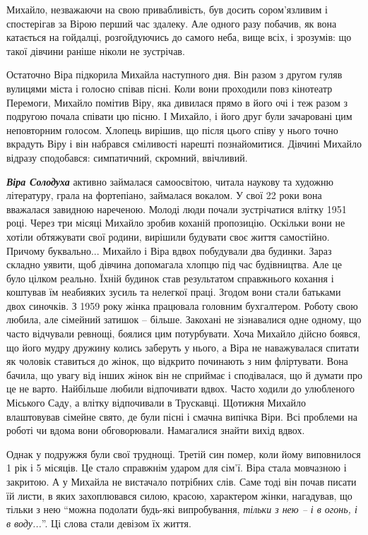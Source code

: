 
Михайло, незважаючи на свою привабливість, був досить сором'язливим і
спостерігав за Вірою перший час здалеку. Але одного разу побачив, як вона
катається на гойдалці, розгойдуючись до самого неба, вище всіх, і зрозумів: що
такої дівчини раніше ніколи не зустрічав.

Остаточно Віра підкорила Михайла наступного дня. Він разом з другом гуляв
вулицями міста і голосно співав пісні. Коли вони проходили повз кінотеатр
Перемоги, Михайло помітив Віру, яка дивилася прямо в його очі і теж разом з
подругою почала співати цю пісню. І Михайло, і його друг були зачаровані цим
неповторним голосом. Хлопець вирішив, що після цього співу у нього точно
вкрадуть Віру і він набрався сміливості нарешті познайомитися. Дівчині Михайло
відразу сподобався: симпатичний, скромний, ввічливий.


\emph{\textbf{Віра Солодуха}} активно займалася самоосвітою, читала наукову та художню
літературу, грала на фортепіано, займалася вокалом. У свої 22 роки вона
вважалася завидною нареченою. Молоді люди почали зустрічатися влітку 1951 році.
Через три місяці Михайло зробив коханій пропозицію. Оскільки вони не хотіли
обтяжувати свої родини, вирішили будувати своє життя самостійно. Причому
буквально... Михайло і Віра вдвох побудували два будинки. Зараз складно уявити,
щоб дівчина допомагала хлопцю під час будівництва. Але це було цілком реально.
Їхній будинок став результатом справжнього кохання і коштував їм неабияких
зусиль та нелегкої праці. Згодом вони стали батьками двох синочків. З 1959 року
жінка працювала головним бухгалтером. Роботу свою любила, але сімейний затишок
– більше. Закохані не зізнавалися одне одному, що часто відчували ревнощі,
боялися цим потурбувати. Хоча Михайло дійсно боявся, що його мудру дружину
колись заберуть у нього, а Віра не наважувалася спитати як чоловік ставиться до
жінок, що відкрито починають з ним фліртувати. Вона бачила, що увагу від інших
жінок він не сприймає і сподівалася, що й думати про це не варто. Найбільше
любили відпочивати вдвох. Часто ходили до улюбленого Міського Саду, а влітку
відпочивали в Трускавці. Щотижня Михайло влаштовував сімейне свято, де були
пісні і смачна випічка Віри. Всі проблеми на роботі чи вдома вони обговорювали.
Намагалися знайти вихід вдвох.

Однак у подружжя були свої труднощі. Третій син помер, коли йому виповнилося 1
рік і 5 місяців. Це стало справжнім ударом для сім'ї. Віра стала мовчазною і
закритою. А у Михайла не вистачало потрібних слів. Саме тоді він почав писати
їй листи, в яких захоплювався силою, красою, характером жінки, нагадував, що
тільки з нею \enquote{можна подолати будь-які випробування, \emph{тільки з нею – і в огонь, і
в воду...}}. Ці слова стали девізом їх життя.

